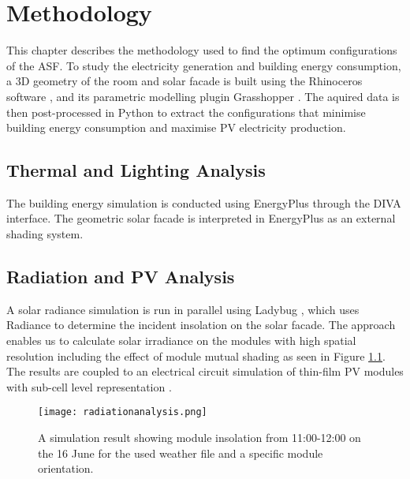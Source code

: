 \chapter{Methodology}

	This chapter describes the methodology used to find the optimum configurations of the ASF. To study the electricity generation and building energy consumption, a 3D geometry of the room and solar facade is built using the Rhinoceros software \cite{Rhino}, and its parametric modelling plugin Grasshopper \cite{grasshopper}. The aquired data is then post-processed in Python \cite{python} to extract the configurations that minimise building energy consumption and maximise PV electricity production.

	\section{Thermal and Lighting Analysis}

		The building energy simulation is conducted using EnergyPlus \cite{energyplus} through the DIVA \cite{DIVA} interface. The geometric solar facade is interpreted in EnergyPlus as an external shading system.  

	\section{Radiation and PV Analysis}

		A solar radiance simulation is run in parallel using Ladybug \cite{roudsari2014ladybug},  which uses Radiance \cite{ward1994radiance} to determine the incident insolation on the solar facade. The approach enables us to calculate solar irradiance on the modules with high spatial resolution including the effect of module mutual shading as seen in Figure \ref{fig:radiation}.  The results are coupled to an electrical circuit simulation of thin-film PV modules with sub-cell level representation \cite{hofer2015PVSEC}.

		\begin{figure}[H]
		\begin{center}
			\texttt{[image: radiationanalysis.png]}
			\caption{A simulation result showing module insolation from 11:00-12:00 on the 16 June for the used weather file and a specific module orientation.}
			\label{fig:radiation}
		\end{center}
		\end{figure}

